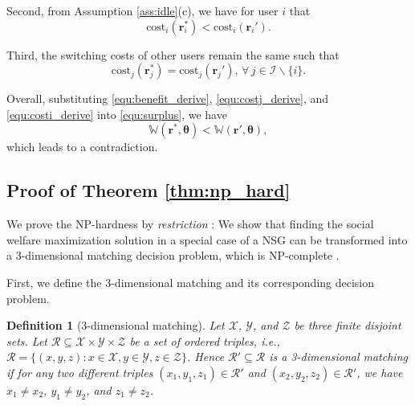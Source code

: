 \documentclass[journal]{IEEEtran}
\newcommand{\bs}[1]{\boldsymbol{#1}}
\newtheorem{definition}{Definition}
\begin{document}
	Second, from Assumption \ref{ass:idle}(c), we have for user $i$ that
%
\begin{equation} \label{equ:costj_derive}
	\text{cost}_i(\bs{r}_i^*) < \text{cost}_i(\bs{r}_i').
\end{equation}
%		
	
	Third, the switching costs of other users remain the same such that
%
\begin{equation} \label{equ:costi_derive}
	\text{cost}_j(\bs{r}_j^*) = \text{cost}_j(\bs{r}_j'), \, \forall \, j \in \mathcal{I} \backslash \{i\}.
\end{equation}
%	

  Overall, substituting \eqref{equ:benefit_derive}, \eqref{equ:costj_derive}, and \eqref{equ:costi_derive} into \eqref{equ:surplus}, we have 
%
\begin{equation} %
	\mathbb{W}(\boldsymbol{r}^*, \boldsymbol{\theta}) < \mathbb{W}(\boldsymbol{r}', \boldsymbol{\theta}),
\end{equation}
%		
which leads to a contradiction.	\hfill \IEEEQED %


\subsection{Proof of Theorem \ref{thm:np_hard}} \label{app:np_hard}

  We prove the NP-hardness by \emph{restriction} \cite{garey_ca79}: We show that finding the social welfare maximization solution in a special case of a NSG can be transformed into a 3-dimensional matching decision problem, which is NP-complete \cite{garey_ca79, kleinberg_ad05}. %
	
	First, we define the 3-dimensional matching and its corresponding decision problem.

\begin{definition}[3-dimensional matching] \label{def:3dmatch} 
  Let $\mathcal{X}$, $\mathcal{Y}$, and $\mathcal{Z}$ be three finite disjoint sets. Let $\mathcal{R} \subseteq \mathcal{X} \times \mathcal{Y} \times \mathcal{Z}$ be a set of ordered triples, i.e., $\mathcal{R} = \{ (x,y,z): x \in \mathcal{X}, y \in \mathcal{Y}, z \in \mathcal{Z} \}$. Hence $\mathcal{R}' \subseteq \mathcal{R}$ is a \emph{3-dimensional matching} if for any two different triples $(x_1, y_1, z_1) \in \mathcal{R}'$ and $(x_2, y_2, z_2) \in \mathcal{R}'$, we have $x_1 \neq x_2$, $y_1 \neq y_2$, and $z_1 \neq z_2$.
\end{definition}
\end{document}

